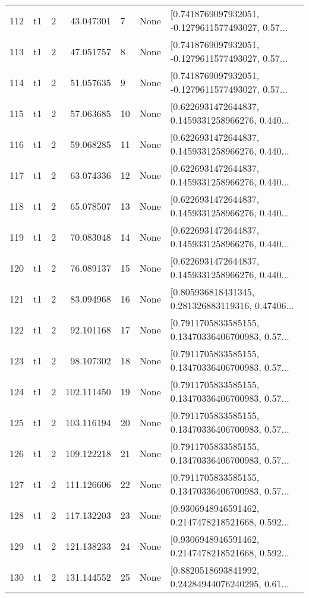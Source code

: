 \begin{tabular}{lllrlll}
112 &  t1 &   2 &   43.047301 &    7 &  None &  [0.7418769097932051, -0.1279611577493027, 0.57... \\
113 &  t1 &   2 &   47.051757 &    8 &  None &  [0.7418769097932051, -0.1279611577493027, 0.57... \\
114 &  t1 &   2 &   51.057635 &    9 &  None &  [0.7418769097932051, -0.1279611577493027, 0.57... \\
115 &  t1 &   2 &   57.063685 &   10 &  None &  [0.6226931472644837, 0.1459331258966276, 0.440... \\
116 &  t1 &   2 &   59.068285 &   11 &  None &  [0.6226931472644837, 0.1459331258966276, 0.440... \\
117 &  t1 &   2 &   63.074336 &   12 &  None &  [0.6226931472644837, 0.1459331258966276, 0.440... \\
118 &  t1 &   2 &   65.078507 &   13 &  None &  [0.6226931472644837, 0.1459331258966276, 0.440... \\
119 &  t1 &   2 &   70.083048 &   14 &  None &  [0.6226931472644837, 0.1459331258966276, 0.440... \\
120 &  t1 &   2 &   76.089137 &   15 &  None &  [0.6226931472644837, 0.1459331258966276, 0.440... \\
121 &  t1 &   2 &   83.094968 &   16 &  None &  [0.805936818431345, 0.281326883119316, 0.47406... \\
122 &  t1 &   2 &   92.101168 &   17 &  None &  [0.7911705833585155, 0.13470336406700983, 0.57... \\
123 &  t1 &   2 &   98.107302 &   18 &  None &  [0.7911705833585155, 0.13470336406700983, 0.57... \\
124 &  t1 &   2 &  102.111450 &   19 &  None &  [0.7911705833585155, 0.13470336406700983, 0.57... \\
125 &  t1 &   2 &  103.116194 &   20 &  None &  [0.7911705833585155, 0.13470336406700983, 0.57... \\
126 &  t1 &   2 &  109.122218 &   21 &  None &  [0.7911705833585155, 0.13470336406700983, 0.57... \\
127 &  t1 &   2 &  111.126606 &   22 &  None &  [0.7911705833585155, 0.13470336406700983, 0.57... \\
128 &  t1 &   2 &  117.132203 &   23 &  None &  [0.9306948946591462, 0.2147478218521668, 0.592... \\
129 &  t1 &   2 &  121.138233 &   24 &  None &  [0.9306948946591462, 0.2147478218521668, 0.592... \\
130 &  t1 &   2 &  131.144552 &   25 &  None &  [0.8820518693841992, 0.24284944076240295, 0.61... \\

\end{tabular}
